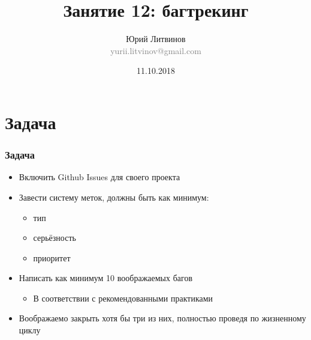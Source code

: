 \documentclass[xetex,mathserif,serif]{beamer}
\title{Занятие 12: багтрекинг}
\author[Юрий Литвинов]{Юрий Литвинов\\\small{\textcolor{gray}{yurii.litvinov@gmail.com}}}
\date{11.10.2018}
\begin{document}
	\frame{\titlepage}

	\section{Задача}

	\begin{frame}
		\frametitle{Задача}
		\begin{itemize}
			\item Включить Github Issues для своего проекта
			\item Завести систему меток, должны быть как минимум:
			\begin{itemize}
				\item тип
				\item серьёзность
				\item приоритет
			\end{itemize}
			\item Написать как минимум 10 воображаемых багов
			\begin{itemize}
				\item В соответствии с рекомендованными практиками
			\end{itemize}
			\item Воображаемо закрыть хотя бы три из них, полностью проведя по жизненному циклу
		\end{itemize}
	\end{frame}
\end{document}

